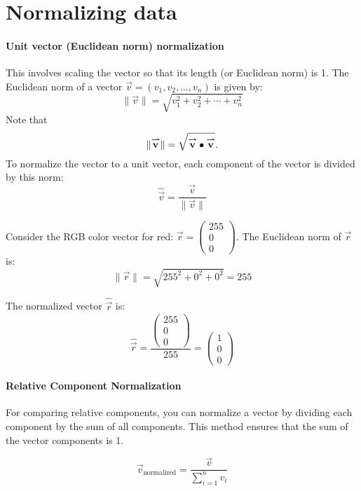 \documentclass{ximera}
\begin{document}

\section{Normalizing data}



\paragraph{Unit vector (Euclidean norm) normalization}

This involves scaling the vector so that its length (or Euclidean
norm) is 1. The Euclidean norm of a vector \(\vec{v} = (v_1, v_2,
\ldots, v_n)\) is given by:
\[
\|\vec{v}\| = \sqrt{v_1^2 + v_2^2 + \cdots + v_n^2}
\]
Note that
\[
\|{\overset{\boldsymbol{\rightharpoonup}}{\mathbf{v}}}\hspace{0in}\| = \sqrt{{\overset{\boldsymbol{\rightharpoonup}}{\mathbf{v}}}\hspace{0in}\bullet{\overset{\boldsymbol{\rightharpoonup}}{\mathbf{v}}}\hspace{0in}}.
\]
To normalize the vector to a unit vector, each component of the vector is divided by this norm:
\[ \hat{\vec{v}} = \frac{\vec{v}}{\|\vec{v}\|} \]

\begin{example}
Consider the RGB color vector for red: \(\vec{r} = \begin{pmatrix}255\\0\\0\end{pmatrix}\). The Euclidean norm of \(\vec{r}\) is:
\[ \|\vec{r}\| = \sqrt{255^2 + 0^2 + 0^2} = 255 \]

The normalized vector \(\hat{\vec{r}}\) is:
\[ \hat{\vec{r}} = \frac{\begin{pmatrix}255\\0\\0\end{pmatrix}}{255} = \begin{pmatrix}1\\0\\0\end{pmatrix} \]
\end{example}
\paragraph{Relative Component Normalization}

For comparing relative components, you can normalize a vector by
dividing each component by the sum of all components. This method
ensures that the sum of the vector components is 1.

\[ \vec{v}_{\text{normalized}} = \frac{\vec{v}}{\sum_{i=1}^n v_i} \]
\end{document}
